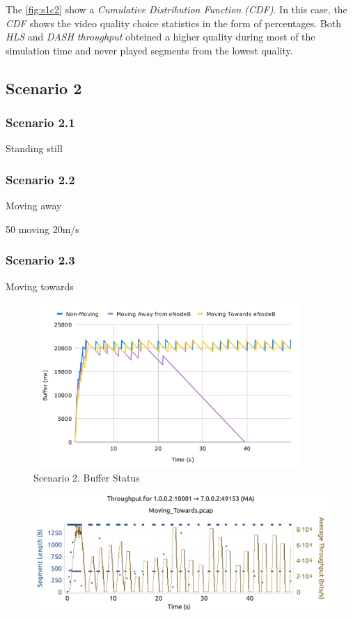 The \autoref{fig:s1c2} show a \textit{Cumulative Distribution Function (CDF)}. In this 
case, the \textit{CDF} shows the video quality choice statistics in the form of percentages. 
Both \textit{HLS} and \textit{DASH throughput} obteined a higher quality during most of 
the simulation time and never played segments from the lowest quality.

\subsection{Scenario 2}

\subsubsection{Scenario 2.1}

Standing still

\subsubsection{Scenario 2.2}

Moving away

50 moving 20m/s

\subsubsection{Scenario 2.3}

Moving towards

\begin{figure}[h]
    \centering
    \includegraphics[width=0.9\textwidth]{img/s2c1.pdf}
    \caption{Scenario 2. Buffer Status}
    \label{fig:s2c1}
\end{figure}

\begin{figure}[h]
    \centering
    \includegraphics[width=\textwidth]{img/s2c2_1.pdf}
\end{figure}

